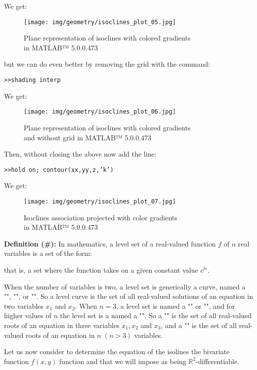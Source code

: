 {	We get:
	\begin{figure}[H]
		\centering
		\texttt{[image: img/geometry/isoclines\_plot\_05.jpg]}
		\caption{Plane representation of isoclines with colored gradients \\in MATLAB™ 5.0.0.473}
	\end{figure}
	
	but we can do even better by removing the grid with the command:
	
	\texttt{>>shading interp}
	
	We get:
	\begin{figure}[H]
		\centering
		\texttt{[image: img/geometry/isoclines\_plot\_06.jpg]}
		\caption[]{Plane representation of isoclines with colored gradients \\and without grid in MATLAB™ 5.0.0.473}
	\end{figure}
	Then, without closing the above now add the line:
	
	
	\texttt{>>hold on; contour(xx,yy,z,'k')}
	
	We get:
	\begin{figure}[H]
		\centering
		\texttt{[image: img/geometry/isoclines\_plot\_07.jpg]}
		\caption{Isoclines association projected with color gradients \\in MATLAB™ 5.0.0.473}
	\end{figure}
	\textbf{Definition (\#\mydef):} In mathematics, a level set of a real-valued function $f$ of $n$ real variables is a set of the form:
	
	that is, a set where the function takes on a given constant value $c^{te}$.
	
	When the number of variables is two, a level set is generically a curve, named a "", "", or "". So a level curve is the set of all real-valued solutions of an equation in two variables $x_1$ and $x_2$. When $n = 3$, a level set is named a "" or "", and for higher values of $n$ the level set is a named a "". So a "" is the set of all real-valued roots of an equation in three variables $x_1, x_2$ and $x_3$, and a "" is the set of all real-valued roots of an equation in $n\; (n > 3)$ variables.
	
	Let us now consider to determine the equation of the isolines the bivariate function $f(x,y)$ function and that we will impose as being $\mathbb{R}^2$-differentiable.
	
}
